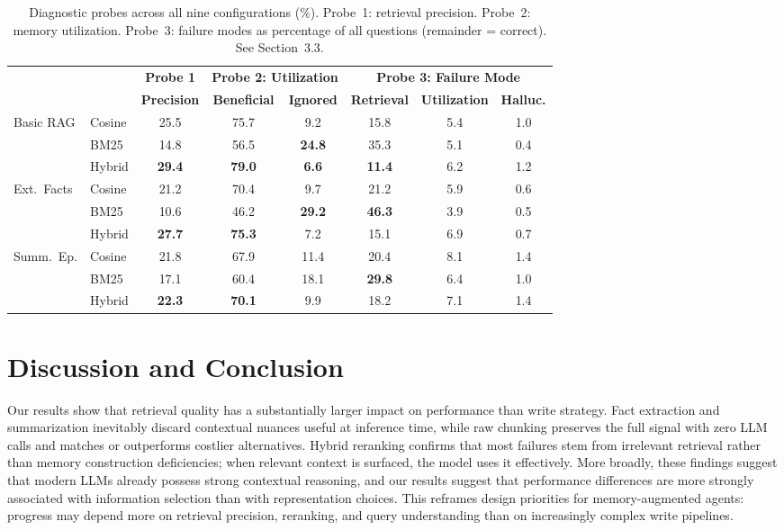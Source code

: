 \documentclass{article} %
\begin{document}
\begin{table}[H]
\caption{Diagnostic probes across all nine configurations (\%). Probe~1: retrieval precision. Probe~2: memory utilization. Probe~3: failure modes as percentage of all questions (remainder = correct). See Section~3.3.}
\label{tab:all-probes}
\centering
\small
\begin{tabular}{llc|cc|ccc}
\toprule
& & \multicolumn{1}{c}{\textbf{Probe 1}} & \multicolumn{2}{c}{\textbf{Probe 2: Utilization}} & \multicolumn{3}{c}{\textbf{Probe 3: Failure Mode}} \\
\cmidrule(lr){3-3} \cmidrule(lr){4-5} \cmidrule(lr){6-8}
& & \textbf{Precision} & \textbf{Beneficial} & \textbf{Ignored} & \textbf{Retrieval} & \textbf{Utilization} & \textbf{Halluc.} \\
\midrule
\multirow{3}{*}{Basic RAG}
& Cosine & 25.5 & 75.7 & 9.2 & 15.8 & 5.4 & 1.0 \\
& BM25 & 14.8 & 56.5 & \textbf{24.8} & 35.3 & 5.1 & 0.4 \\
& Hybrid & \textbf{29.4} & \textbf{79.0} & \textbf{6.6} & \textbf{11.4} & 6.2 & 1.2 \\
\midrule
\multirow{3}{*}{Ext.\ Facts}
& Cosine & 21.2 & 70.4 & 9.7 & 21.2 & 5.9 & 0.6 \\
& BM25 & 10.6 & 46.2 & \textbf{29.2} & \textbf{46.3} & 3.9 & 0.5 \\
& Hybrid & \textbf{27.7} & \textbf{75.3} & 7.2 & 15.1 & 6.9 & 0.7 \\
\midrule
\multirow{3}{*}{Summ.\ Ep.}
& Cosine & 21.8 & 67.9 & 11.4 & 20.4 & 8.1 & 1.4 \\
& BM25 & 17.1 & 60.4 & 18.1 & \textbf{29.8} & 6.4 & 1.0 \\
& Hybrid & \textbf{22.3} & \textbf{70.1} & 9.9 & 18.2 & 7.1 & 1.4 \\
\bottomrule
\end{tabular}
\end{table}


\section{Discussion and Conclusion}

Our results show that retrieval quality has a substantially larger impact on performance than write strategy. Fact extraction and summarization inevitably discard contextual nuances useful at inference time, while raw chunking preserves the full signal with zero LLM calls and matches or outperforms costlier alternatives. Hybrid reranking confirms that most failures stem from irrelevant retrieval rather than memory construction deficiencies; when relevant context is surfaced, the model uses it effectively. More broadly, these findings suggest that modern LLMs already possess strong contextual reasoning, and our results suggest that performance differences are more strongly associated with information selection than with representation choices. This reframes design priorities for memory-augmented agents: progress may depend more on retrieval precision, reranking, and query understanding than on increasingly complex write pipelines.
\end{document}
